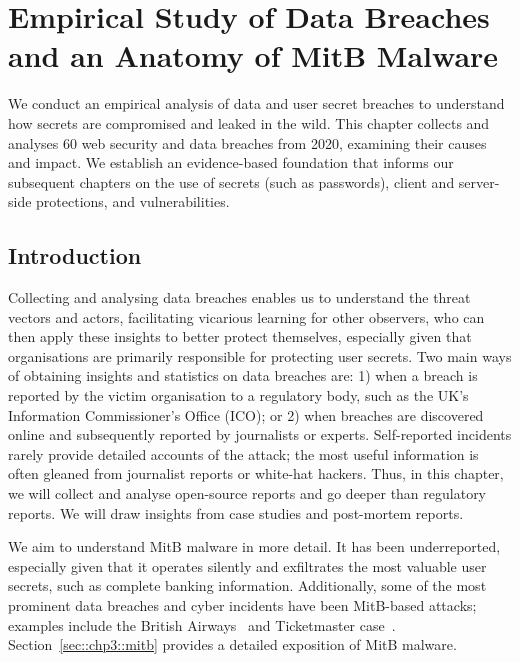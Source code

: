 \chapter{Empirical Study of Data Breaches \\ and an Anatomy of MitB Malware}
\label{chp3::breaches}

\vspace*{-0.5cm}
We conduct an empirical analysis of data and user secret breaches to understand how secrets are compromised and leaked in the wild. This chapter collects and analyses 60 web security and data breaches from 2020, examining their causes and impact. We establish an evidence-based foundation that informs our subsequent chapters on the use of secrets (such as passwords), client and server-side protections, and vulnerabilities.

\vspace*{-0.5cm}
\section{Introduction}
\label{sec::chp3::introduction}

Collecting and analysing data breaches enables us to understand the threat vectors and actors, facilitating vicarious learning for other observers, who can then apply these insights to better protect themselves, especially given that organisations are primarily responsible for protecting user secrets. Two main ways of obtaining insights and statistics on data breaches are: 1) when a breach is reported by the victim organisation to a regulatory body, such as the UK's Information Commissioner's Office (ICO); or 2) when breaches are discovered online and subsequently reported by journalists or experts. Self-reported incidents rarely provide detailed accounts of the attack; the most useful information is often gleaned from journalist reports or white-hat hackers. Thus, in this chapter, we will collect and analyse open-source reports and go deeper than regulatory reports. We will draw insights from case studies and post-mortem reports.

We aim to understand MitB malware in more detail. It has been underreported, especially given that it operates silently and exfiltrates the most valuable user secrets, such as complete banking information. Additionally, some of the most prominent data breaches and cyber incidents have been MitB-based attacks; examples include the British Airways~\cite{klijnsma_british_2018} and Ticketmaster case~\cite{corfield_ticketmaster_nodate}. Section~\ref{sec::chp3::mitb} provides a detailed exposition of MitB malware.

